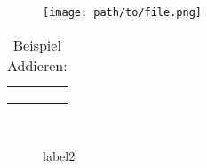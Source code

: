 
\begin{figure}[H]
    \begin{center}
        \texttt{[image: path/to/file.png]}
        \caption{\imgfilename}
        \label{fig:A1_label}
    \end{center}
\end{figure}



\begin{table}[ht]
    \centering
    \begin{tabular}{|c|c|c|c|}\hline
    \tbf{}     & \tbf{} & \tbf{} \\ \hline
                       &    &            \\
                 &   &         \\ \hline
                     &  &  \\ \hline
    \end{tabular}
    \caption{Beispiel Addieren:}
\end{table}


\iffalse
\fi

\begin{figure}[h]
\begin{center}
 \\
\caption{label2}
\label{some example}
\end{center}
\end{figure}